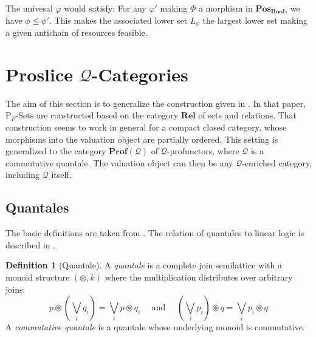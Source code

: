 \documentclass[12pt]{article}
\theoremstyle{definition}
\newtheorem{definition}{Definition}[section]
\theoremstyle{plain}
\theoremstyle{plain}
\theoremstyle{plain}
\theoremstyle{plain}
\theoremstyle{remark}
\theoremstyle{remark}
\newcommand{\mc}[1]{\mathcal{#1}}
\begin{document}
\begin{center}
\end{center}

The univesal $\varphi$ would satisfy: For any $\varphi'$ making $\Phi$ a morphism in $\mathbf{Pos_{Bool}}$, we have $\phi \leq \phi'$. This makes the associated lower set $L_\phi$ the largest lower set making a given antichain of resources feasible.

\section{Proslice $\mc{Q}$-Categories}

The aim of this section is to generalize the construction given in \cite{Schalk2004}. In that paper, $\text{P}_F\text{-Sets}$ are constructed based on the category $\mathbf{Rel}$ of sets and relations. That construction seems to work in general for a compact closed category, whose morphisms into the valuation object are partially ordered. This setting is generalized to the category $\mathbf{Prof}(\mc{Q})$ of $\mc{Q}$-profunctors, where $\mc{Q}$ is a commutative quantale. The valuation object can then be any $\mc{Q}$-enriched category, including $\mc{Q}$ itself.

\subsection{Quantales}
The basic definitions are taken from \cite{Marsden2018}. The relation of quantales to linear logic is described in \cite{Yetter1990}.

\begin{definition}[Quantale]
	A \emph{quantale} is a complete join semilattice with a monoid structure $(\circledast, k)$ where the multiplication distributes over arbitrary joins:
	$$
	p \circledast \left( \bigvee_i q_i \right) = \bigvee_i p \circledast q_i \quad \text{ and } \quad \left( \bigvee_i p_i \right) \circledast q = \bigvee_i p_i \circledast q
	$$
	A \emph{commutative quantale} is a quantale whose underlying monoid is commutative.
\end{definition}
\end{document}
